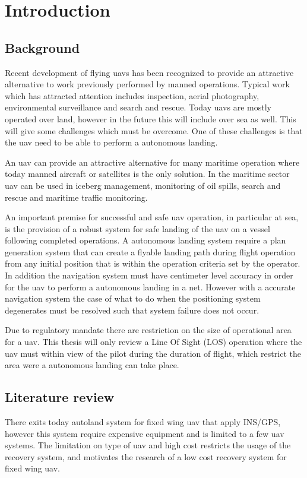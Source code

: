 \chapter{Introduction}
\section{Background}
Recent development of flying \glspl{uav} has been recognized to provide an attractive alternative to work previously performed by manned operations. Typical work which has attracted attention includes inspection, aerial photography, environmental surveillance and search and rescue. Today \glspl{uav} are mostly operated over land, however in the future this will include over sea as well. This will give some challenges which must be overcome. One of these challenges is that the \gls{uav} need to be able to perform a autonomous landing.

An \gls{uav} can provide an attractive alternative for many maritime operation where today manned aircraft or satellites is the only solution. In the maritime sector \gls{uav} can be used in iceberg management, monitoring of oil spills, search and rescue and maritime traffic monitoring.

An important premise for successful and safe \gls{uav} operation, in particular at sea, is the provision of a robust system for safe landing of the \gls{uav} on a vessel following completed operations. A autonomous landing system require a plan generation system that can create a flyable landing path during flight operation from any initial position that is within the operation criteria set by the operator. In addition the navigation system must have centimeter level accuracy in order for the \gls{uav} to perform a autonomous landing in a net. However with a accurate navigation system the case of what to do when the positioning system degenerates must be resolved such that system failure does not occur.

Due to regulatory mandate there are restriction on the size of operational area for a \gls{uav}. This thesis will only review a Line Of Sight (LOS) operation where the \gls{uav} must within view of the pilot during the duration of flight, which restrict the area were a autonomous landing can take place.

\section{Literature review}
There exits today autoland system for fixed wing \gls{uav} that apply INS/GPS\citep{SkyHook}, however this system require expensive equipment and is limited to a few \gls{uav} systems. The limitation on type of \gls{uav} and high cost restricts the usage of the recovery system, and motivates the research of a low cost recovery system for fixed wing \gls{uav}.


